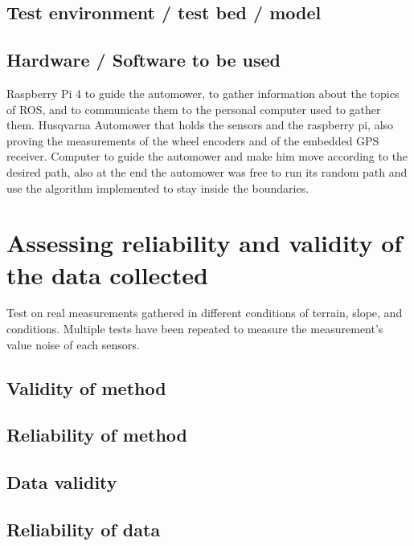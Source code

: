 \subsection{Test environment / test bed / model}

\subsection{Hardware / Software to be used}
Raspberry Pi 4 to guide the automower, to gather information about the topics of ROS, and to communicate them to the personal computer used to gather them.
Husqvarna Automower that holds the sensors and the raspberry pi, also proving the measurements of the wheel encoders and of the embedded GPS receiver.
Computer to guide the automower and make him move according to the desired path, also at the end the automower was free to run its random path and use the algorithm implemented to stay inside the boundaries.


\section{Assessing reliability and validity of the data collected}
\label{sec:assessingReliability}
Test on real measurements gathered in different conditions of terrain, slope, and conditions.
Multiple tests have been repeated to measure the measurement's value noise of each sensors.


\subsection{Validity of method}

\subsection{Reliability of method}

\subsection{Data validity}

\subsection{Reliability of data}


